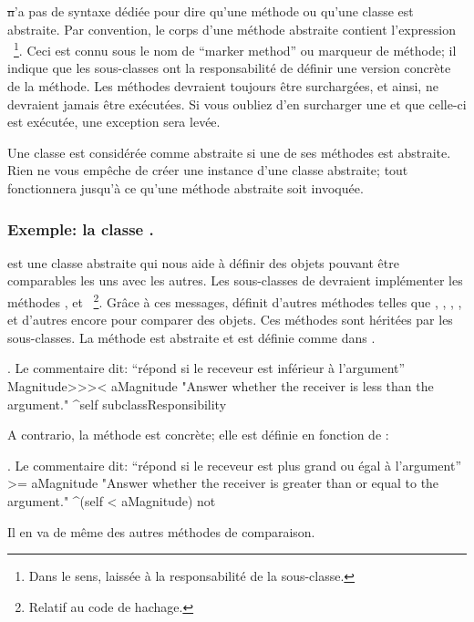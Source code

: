 \documentclass[a4paper,10pt,twoside]{book}
\begin{document}
\st n'a pas de syntaxe dédiée pour dire qu'une méthode ou qu'une classe est abstraite. 
Par convention, le corps d'une méthode abstraite contient l'expression ~\footnote{Dans le sens, laissée à la responsabilité de la sous-classe.}. 
Ceci est connu sous le nom de ``marker method'' ou marqueur de méthode; il indique que les sous-classes ont la responsabilité de définir une version concrète de la méthode. 
Les méthodes  devraient toujours être surchargées, et ainsi, ne devraient jamais être exécutées.
Si vous oubliez d'en surcharger une et que celle-ci est exécutée, une exception sera levée. 

Une classe est considérée comme abstraite si une de ses méthodes est abstraite.
Rien ne vous empêche de créer une instance d'une classe abstraite; tout fonctionnera jusqu'à ce qu'une méthode abstraite soit invoquée. 

\subsubsection{Exemple: la classe .}
 est une classe abstraite qui nous aide à définir
des objets pouvant être comparables les uns avec les autres. Les
sous-classes de  devraient implémenter les méthodes
\ct{<}, \ct{=} et ~\footnote{Relatif au code de hachage.}.
Grâce à ces messages,  définit d'autres méthodes telles que
\ct{>}, \ct{>=}, \ct{<=}, ,   et
d'autres encore pour comparer des objets.
Ces méthodes sont héritées par les sous-classes.
La méthode  est abstraite et est définie comme
dans .

\begin{method}[MagnitudeLessThan]{. Le commentaire dit: ``répond si le receveur est inférieur à l'argument''}
Magnitude>>>< aMagnitude 
	"Answer whether the receiver is less than the argument."
	^self subclassResponsibility
\end{method}

\noindent
A contrario, la méthode  est concrète; elle est définie en fonction de \ct{<}:

\begin{method}[Magnitude>=]{. Le commentaire dit: ``répond si le receveur est plus grand ou égal à l'argument''}
>= aMagnitude 
	"Answer whether the receiver is greater than or equal to the argument."
	^(self < aMagnitude) not
\end{method}
Il en va de même des autres méthodes de comparaison.
\end{document}
